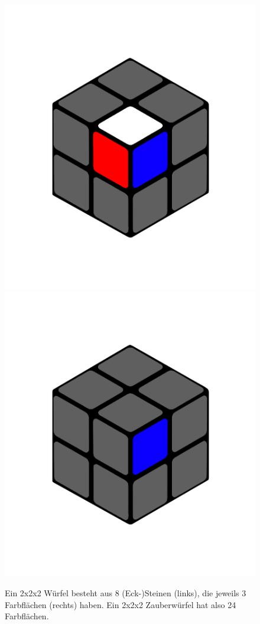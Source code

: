 \documentclass[12pt,a4paper, usenames, dvipsnames]{scrartcl}
\begin{document}
\begin{figure}[h]
\centering
\includegraphics[scale=0.1]{2x2stein.png}
\includegraphics[scale=0.1]{2x2farbflaeche.png}
\caption{Ein 2x2x2 Würfel besteht aus 8 (Eck-)Steinen (links), die jeweils 3 Farbflächen (rechts) haben. Ein 2x2x2 Zauberwürfel hat also 24 Farbflächen.}
\end{figure}
\end{document}
